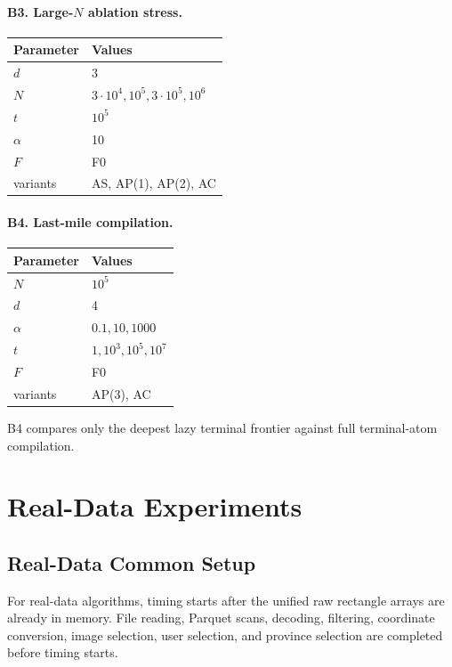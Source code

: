 \documentclass[11pt]{article}
\newcommand{\AC}{\textsc{AC}}
\newcommand{\AS}{\textsc{AS}}
\newcommand{\AP}{\textsc{AP}}
\begin{document}
\paragraph{B3. Large-$N$ ablation stress.}
\begin{center}
\begin{tabularx}{0.82\linewidth}{@{}lY@{}}
\toprule
Parameter & Values \\
\midrule
$d$ & 3 \\
$N$ & $3\cdot10^4,10^5,3\cdot10^5,10^6$ \\
$t$ & $10^5$ \\
$\alpha$ & 10 \\
$F$ & F0 \\
variants & \AS, \AP(1), \AP(2), \AC \\
\bottomrule
\end{tabularx}
\end{center}

\paragraph{B4. Last-mile compilation.}
\begin{center}
\begin{tabularx}{0.82\linewidth}{@{}lY@{}}
\toprule
Parameter & Values \\
\midrule
$N$ & $10^5$ \\
$d$ & 4 \\
$\alpha$ & $0.1,10,1000$ \\
$t$ & $1,10^3,10^5,10^7$ \\
$F$ & F0 \\
variants & \AP(3), \AC \\
\bottomrule
\end{tabularx}
\end{center}
B4 compares only the deepest lazy terminal frontier against full terminal-atom compilation.

\section{Real-Data Experiments}

\subsection{Real-Data Common Setup}
For real-data algorithms, timing starts after the unified raw rectangle arrays are already in memory.  File reading, Parquet scans, decoding, filtering, coordinate conversion, image selection, user selection, and province selection are completed before timing starts.
\end{document}

